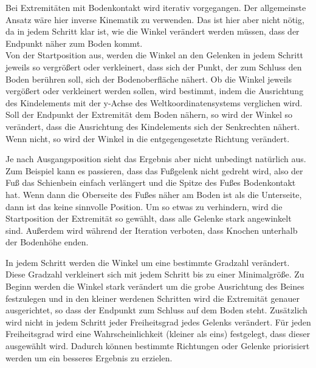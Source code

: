 Bei Extremitäten mit Bodenkontakt wird iterativ vorgegangen. Der allgemeinste Ansatz wäre hier inverse Kinematik zu verwenden. Das ist hier aber nicht nötig, da in jedem Schritt klar ist, wie die Winkel verändert werden müssen, dass der Endpunkt näher zum Boden kommt. \\
Von der Startposition aus, werden die Winkel an den Gelenken in jedem Schritt jeweils so vergrößert oder verkleinert, dass sich der Punkt, der zum Schluss den Boden berühren soll, sich der Bodenoberfläche nähert. Ob die Winkel jeweils vergößert oder verkleinert werden sollen, wird bestimmt, indem die Ausrichtung des Kindelements mit der y-Achse des Weltkoordinatensystems verglichen wird. Soll der Endpunkt der Extremität dem Boden nähern, so wird der Winkel so verändert, dass die Ausrichtung des Kindelements sich der Senkrechten nähert. Wenn nicht, so wird der Winkel in die entgegengesetzte Richtung verändert. 

Je nach Ausgangsposition sieht das Ergebnis aber nicht unbedingt natürlich aus. Zum Beispiel kann es passieren, dass das Fußgelenk nicht gedreht wird, also der Fuß das Schienbein einfach verlängert und die Spitze des Fußes Bodenkontakt hat. Wenn dann die Oberseite des Fußes näher am Boden ist als die Unterseite, dann ist das keine sinnvolle Position.
Um so etwas zu verhindern, wird die Startposition der Extremität so gewählt, dass alle Gelenke stark angewinkelt sind. 
Außerdem wird während der Iteration verboten, dass Knochen unterhalb der Bodenhöhe enden.

In jedem Schritt werden die Winkel um eine bestimmte Gradzahl verändert. Diese Gradzahl verkleinert sich mit jedem Schritt bis zu einer Minimalgröße. Zu Beginn werden die Winkel stark verändert um die grobe Ausrichtung des Beines festzulegen und in den kleiner werdenen Schritten wird die Extremität genauer ausgerichtet, so dass der Endpunkt zum Schluss auf dem Boden steht. 
Zusätzlich wird nicht in jedem Schritt jeder Freiheitsgrad jedes Gelenks verändert. Für jeden Freiheitsgrad wird eine Wahrscheinlichkeit (kleiner als eins) festgelegt, dass dieser ausgewählt wird. Dadurch können bestimmte Richtungen oder Gelenke priorisiert werden um ein besseres Ergebnis zu erzielen. 

